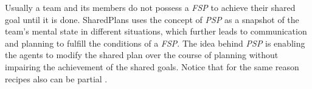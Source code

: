 \documentclass[12pt]{report}
\begin{document}
% 

Usually a team and its members do not possess a \textit{FSP} to achieve
their shared goal until it is done. SharedPlans uses the concept of \textit{PSP}
as a snapshot of the team's mental state in different situations, which further
leads to communication and planning to fulfill the conditions of a \textit{FSP}.
The idea behind \textit{PSP} is enabling the agents to modify the shared plan
over the course of planning without impairing the achievement of the shared
goals. Notice that for the same reason recipes also can be partial
\cite{grosz:collaboration, grosz:plans-discourse}.
\end{document}
